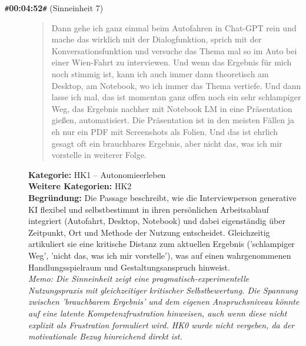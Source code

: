 \begin{description}
  \item[\texttt{\#}\textbf{00:04:52}\texttt{\#} (Sinneinheit 7)]
  \begin{quote}
  Dann gehe ich ganz einmal beim Autofahren in Chat-GPT rein und mache das wirklich mit der Dialogfunktion, sprich mit der Konversationsfunktion und versuche das Thema mal so im Auto bei einer Wien-Fahrt zu interviewen. Und wenn das Ergebnis für mich noch stimmig ist, kann ich auch immer dann theoretisch am Desktop, am Notebook, wo ich immer das Thema vertiefe. Und dann lasse ich mal, das ist momentan ganz offen noch ein sehr schlampiger Weg, das Ergebnis nachher mit Notebook LM in eine Präsentation gießen, automatisiert. Die Präsentation ist in den meisten Fällen ja eh nur ein PDF mit Screenshots als Folien. Und das ist ehrlich gesagt oft ein brauchbares Ergebnis, aber nicht das, was ich mir vorstelle in weiterer Folge.
  \end{quote}
  \textbf{Kategorie:} HK1 -- Autonomieerleben\\
  \textbf{Weitere Kategorien:} HK2\\
  \textbf{Begr\"undung:} Die Passage beschreibt, wie die Interviewperson generative KI flexibel und selbstbestimmt in ihren persönlichen Arbeitsablauf integriert (Autofahrt, Desktop, Notebook) und dabei eigenständig über Zeitpunkt, Ort und Methode der Nutzung entscheidet. Gleichzeitig artikuliert sie eine kritische Distanz zum aktuellen Ergebnis ('schlampiger Weg', 'nicht das, was ich mir vorstelle'), was auf einen wahrgenommenen Handlungsspielraum und Gestaltungsanspruch hinweist.
  \\\textit{Memo: Die Sinneinheit zeigt eine pragmatisch-experimentelle Nutzungspraxis mit gleichzeitiger kritischer Selbstbewertung. Die Spannung zwischen 'brauchbarem Ergebnis' und dem eigenen Anspruchsniveau könnte auf eine latente Kompetenzfrustration hinweisen, auch wenn diese nicht explizit als Frustration formuliert wird. HK0 wurde nicht vergeben, da der motivationale Bezug hinreichend direkt ist.}
\end{description}
\medskip

